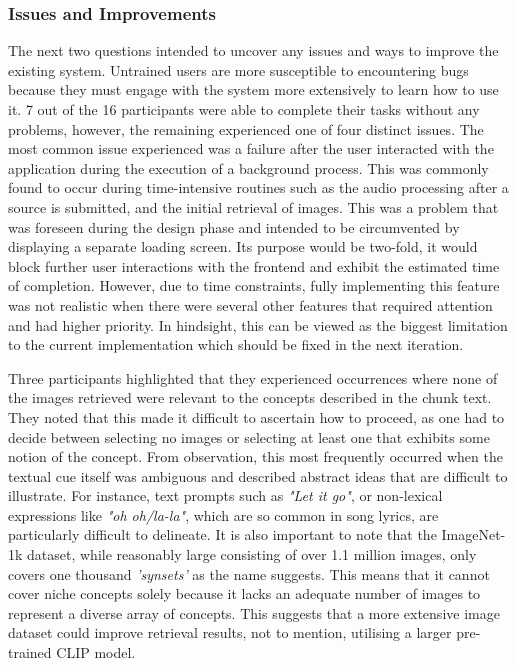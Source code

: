\documentclass{l4proj}
\begin{document}
\subsubsection{Issues and Improvements}
The next two questions intended to uncover any issues and ways to improve the existing system. Untrained users are more susceptible to encountering bugs because they must engage with the system more extensively to learn how to use it. 7 out of the 16 participants were able to complete their tasks without any problems, however, the remaining experienced one of four distinct issues. The most common issue experienced was a failure after the user interacted with the application during the execution of a background process. This was commonly found to occur during time-intensive routines such as the audio processing after a source is submitted, and the initial retrieval of images. This was a problem that was foreseen during the design phase and intended to be circumvented by displaying a separate loading screen. Its purpose would be two-fold, it would block further user interactions with the frontend and exhibit the estimated time of completion. However, due to time constraints, fully implementing this feature was not realistic when there were several other features that required attention and had higher priority. In hindsight, this can be viewed as the biggest limitation to the current implementation which should be fixed in the next iteration.

Three participants highlighted that they experienced occurrences where none of the images retrieved were relevant to the concepts described in the chunk text. They noted that this made it difficult to ascertain how to proceed, as one had to decide between selecting no images or selecting at least one that exhibits some notion of the concept. From observation, this most frequently occurred when the textual cue itself was ambiguous and described abstract ideas that are difficult to illustrate. For instance, text prompts such as \emph{"Let it go"}, or non-lexical expressions like \emph{"oh oh/la-la"}, which are so common in song lyrics, are particularly difficult to delineate. It is also important to note that the ImageNet-1k dataset, while reasonably large consisting of over 1.1 million images, only covers one thousand \emph{'synsets'} as the name suggests. This means that it cannot cover niche concepts solely because it lacks an adequate number of images to represent a diverse array of concepts. This suggests that a more extensive image dataset could improve retrieval results, not to mention, utilising a larger pre-trained CLIP model.
\end{document}
